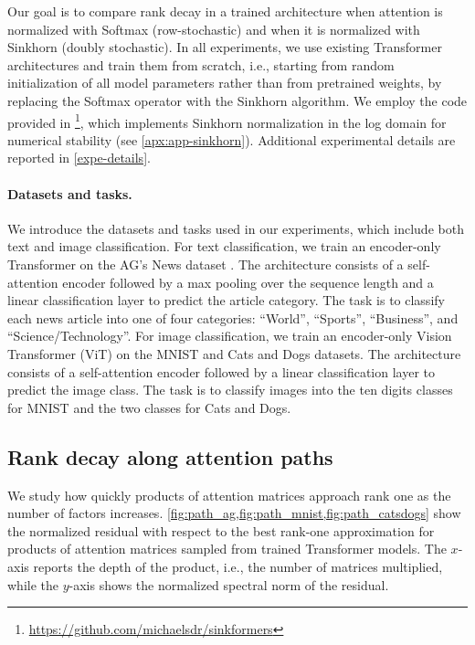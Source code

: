 \documentclass{article}
\theoremstyle{definition}
\theoremstyle{plain}
\begin{document}
Our goal is to compare rank decay in a trained architecture when attention is normalized with Softmax (row-stochastic) and when it is normalized with Sinkhorn (doubly stochastic). In all experiments, we use existing Transformer architectures and train them from scratch, i.e., starting from random initialization of all model parameters rather than from pretrained weights, by replacing the Softmax operator with the Sinkhorn algorithm. We employ the code provided in \cite{sinkformer}\footnote{\url{https://github.com/michaelsdr/sinkformers}}, which implements Sinkhorn normalization in the log domain for numerical stability (see \cref{apx:app-sinkhorn}). Additional experimental details are reported in \cref{expe-details}.

\paragraph{Datasets and tasks.}
{We introduce the datasets and tasks used in our experiments, which include both text and image classification. For text classification, we train an encoder-only Transformer on the AG’s News dataset \cite{ag_news}. The architecture consists of a self-attention encoder followed by a max pooling over the sequence length and a linear classification layer to predict the article category. The task is to classify each news article into one of four categories: ``World'', ``Sports'', ``Business'', and ``Science/Technology''. For image classification, we train an encoder-only Vision Transformer (ViT) \cite{dosovitskiy2021vit} on the MNIST \cite{mnist} and Cats and Dogs \cite{dogs_vs_cats} datasets.  The architecture consists of a self-attention encoder followed by a linear classification layer to predict the image class. The task is to classify images into the ten digits classes for MNIST and the two classes for Cats and Dogs.}

\subsection{Rank decay along attention paths}
\label{chained_att}

{We study how quickly products of attention matrices approach rank one as the number of factors increases. \cref{fig:path_ag,fig:path_mnist,fig:path_catsdogs} show the normalized residual with respect to the best rank-one approximation for products of attention matrices sampled from trained Transformer models. The $x$-axis reports the depth of the product, i.e., the number of matrices multiplied, while the $y$-axis shows the normalized spectral norm of the residual.}
\end{document}
